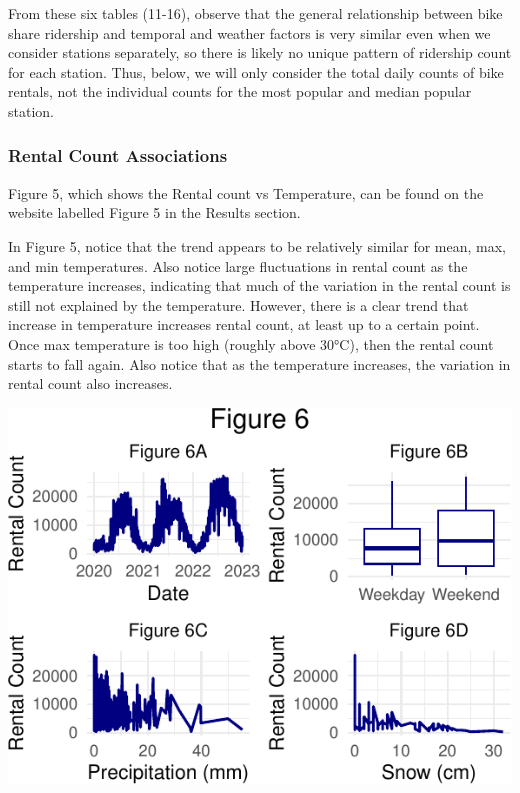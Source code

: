 \documentclass[
]{article}
\begin{document}
From these six tables (11-16), observe that the general relationship
between bike share ridership and temporal and weather factors is very
similar even when we consider stations separately, so there is likely no
unique pattern of ridership count for each station. Thus, below, we will
only consider the total daily counts of bike rentals, not the individual
counts for the most popular and median popular station.

\hypertarget{rental-count-associations}{%
\subsubsection{Rental Count
Associations}\label{rental-count-associations}}

Figure 5, which shows the Rental count vs Temperature, can be found on
the website labelled Figure 5 in the Results section.

In Figure 5, notice that the trend appears to be relatively similar for
mean, max, and min temperatures. Also notice large fluctuations in
rental count as the temperature increases, indicating that much of the
variation in the rental count is still not explained by the temperature.
However, there is a clear trend that increase in temperature increases
rental count, at least up to a certain point. Once max temperature is
too high (roughly above 30°C), then the rental count starts to fall
again. Also notice that as the temperature increases, the variation in
rental count also increases.

\begin{center}\includegraphics{Report_files/figure-latex/unnamed-chunk-15-1} \end{center}
\end{document}
